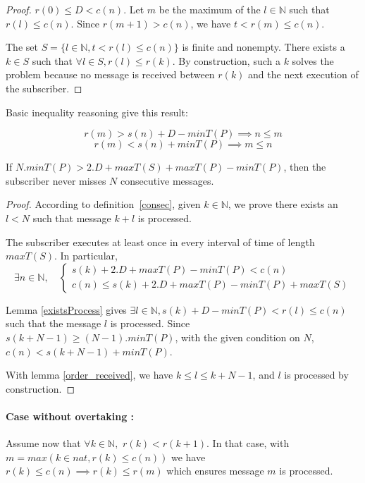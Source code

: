 \begin{proof}
$r(0) \leq D < c(n)$. Let $m$ be the maximum of the $l \in \mathbb{N}$ such that $r(l) \leq c(n)$. Since $r(m + 1) > c(n)$, we have $t < r(m) \leq c(n)$.

The set $S = \{l \in \mathbb{N}, t < r(l) \leq c(n)\}$ is finite and nonempty. There exists a $k \in S$ such that $\forall l \in S, r(l) \leq r(k)$. By construction, such a $k$ solves the problem because no message is received between $r(k)$ and the next execution of the subscriber.
\end{proof}

Basic inequality reasoning give this result:

\begin{lem}\label{order_received}
\[ r(m) > s(n) + D - minT(P) \implies n \leq m \]
\[ r(m) < s(n) + minT(P) \implies m \leq n\]
\end{lem}

\begin{thm}\label{clm}

If $N.minT(P) > 2.D + maxT(S) + maxT(P) - minT(P)$, then the subscriber never misses $N$ consecutive messages.
\end{thm}

\begin{proof}
According to definition~\ref{consec}, given $k \in \mathbb N$, we prove there exists an $l < N$ such that message $k + l$ is processed.

The subscriber executes at least once in every interval of time of length $maxT(S)$. In particular, 
\[ \exists n \in \mathbb N, \quad 
\left\{
\begin{array}{l}
s(k) + 2.D + maxT(P) - minT(P) < c(n) \\
c(n) \leq s(k) + 2.D + maxT(P) - minT(P) + maxT(S)
\end{array} \right. \]

Lemma \ref{existsProcess} gives $\exists l \in \mathbb{N}, s(k) + D - minT(P) < r(l) \leq c(n)$ such that the message $l$ is processed. Since $s(k + N - 1) \geq (N-1) . minT(P)$, with the given condition on $N$, $c(n) < s(k + N - 1) + minT(P)$.

With lemma \ref{order_received}, we have $k \leq l \leq k + N - 1$, and $l$ is processed by construction.
\end{proof}

\paragraph{Case without overtaking :} Assume now that $\forall k \in \mathbb N,\,\, r(k) < r(k + 1)$. In that case, with $m = max({k \in nat, r(k) \leq c(n)})$ we have $r(k) \leq c(n) \implies r(k) \leq r(m)$ which ensures message $m$ is processed.

